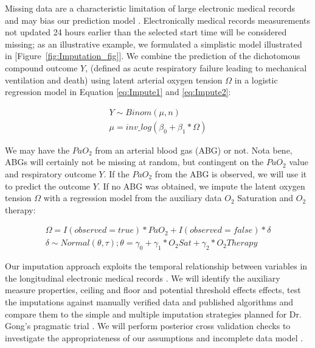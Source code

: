 \documentclass[11pt,notitlepage]{article}
\begin{document}
Missing data are a characteristic limitation of large electronic medical records and may bias our prediction model \cite{Dean_19279318}. Electronically medical records measurements not updated 24 hours earlier than the selected start time will be considered missing;  as an illustrative example, we formulated a simplistic model illustrated in [Figure~\ref{fig:Imputation_fig}]. We combine the prediction of the dichotomous compound outcome $Y$, (defined as acute respiratory failure leading to mechanical ventilation and death) using latent arterial oxygen tension $\Omega$ in a logistic regression model in Equation \ref{eq:Impute1} and \ref{eq:Impute2}: 
\begin{figure}
   \vspace{-20pt}
\begin{align} \label{eq:Impute1}
Y \sim Binom(\mu, n)\\ 
\mu = inv\_log(\beta_{0} + \beta_{1} * \Omega)\label{eq:Impute2}
\end{align}
   \vspace{-20pt}
\end{figure}

We may have the $PaO_{2}$ from an arterial blood gas (ABG) or not. Nota bene, ABGs will certainly not be missing at random, but contingent on the $PaO_2$ value and respiratory outcome $Y$. If the $PaO_{2}$ from the ABG is observed, we will use it to predict the outcome $Y$. If no ABG was obtained, we impute the latent oxygen tension $\Omega$ with a regression model from the auxiliary data  $O_{2}$ Saturation and $O_{2}$ therapy:
 
\begin{figure}
   \vspace{-20pt}
\begin{align}\label{eq:Impute3}
\Omega =  I(observed = true) * PaO_{2}   +   I(observed = false) * \delta  \\ 
\delta \sim Normal(\theta, \tau); 
\theta = \gamma_{0} + \gamma_{1}* O_{2} Sat + \gamma_{2} * O_{2} Therapy \label{eq:Impute4}
\end{align}
   \vspace{-20pt}
\end{figure}

Our imputation approach exploits the temporal relationship between variables in the longitudinal electronic medical records \cite{Welch24782349}. We will identify the auxiliary measure properties, ceiling and floor and potential threshold effects effects, test the imputations against manually verified data and published algorithms and compare them to the simple and multiple imputation strategies planned for Dr. Gong's pragmatic trial \cite{Huntington_16311133,Sloan_15027501}.  We will perform posterior cross validation checks to investigate the appropriateness of our assumptions and incomplete data model \cite{Gelman1998notasked}.
\end{document}
